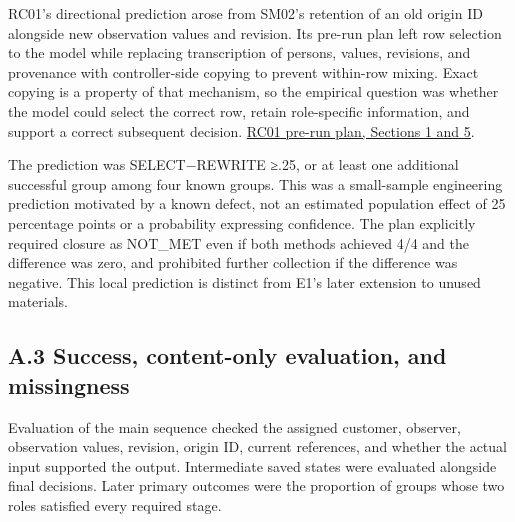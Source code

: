 \documentclass[10pt,a4paper]{article}
\begin{document}
RC01's directional prediction arose from SM02's retention of an old origin ID alongside new observation values and revision. Its pre-run plan left row selection to the model while replacing transcription of persons, values, revisions, and provenance with controller-side copying to prevent within-row mixing. Exact copying is a property of that mechanism, so the empirical question was whether the model could select the correct row, retain role-specific information, and support a correct subsequent decision. \href{https://github.com/metaSATOKEN/MRSI/blob/9443de315d283874df0c27e0e99b8c04f400709d/docs/study2/row-carry-01-plan-v0.1-2026-09-19.md}{RC01 pre-run plan, Sections 1 and 5}.

The prediction was SELECT−REWRITE ≥.25, or at least one additional successful group among four known groups. This was a small-sample engineering prediction motivated by a known defect, not an estimated population effect of 25 percentage points or a probability expressing confidence. The plan explicitly required closure as NOT\_MET even if both methods achieved 4/4 and the difference was zero, and prohibited further collection if the difference was negative. This local prediction is distinct from E1's later extension to unused materials.

\subsection{A.3 Success, content-only evaluation, and missingness}\label{paper-01-a.3-success-content-only-evaluation-and-missingness}

Evaluation of the main sequence checked the assigned customer, observer, observation values, revision, origin ID, current references, and whether the actual input supported the output. Intermediate saved states were evaluated alongside final decisions. Later primary outcomes were the proportion of groups whose two roles satisfied every required stage.
\end{document}
